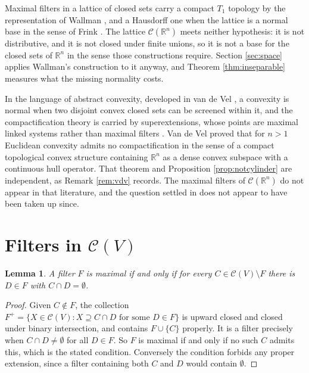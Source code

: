 \documentclass[11pt]{amsart}
\theoremstyle{plain}
\newtheorem{lemma}[theorem]{Lemma}
\theoremstyle{definition}
\newcommand{\CC}{\mathscr{C}}
\newcommand{\RR}{\mathbb{R}}
\begin{document}
Maximal filters in a lattice of closed sets carry a compact $T_1$ topology by the representation of Wallman \cite{Wallman}, and a Hausdorff one when the lattice is a normal base in the sense of Frink \cite{Frink}. The lattice $\CC(\RR^n)$ meets neither hypothesis: it is not distributive, and it is not closed under finite unions, so it is not a base for the closed sets of $\RR^n$ in the sense those constructions require. Section \ref{sec:space} applies Wallman's construction to it anyway, and Theorem \ref{thm:inseparable} measures what the missing normality costs.

In the language of abstract convexity, developed in van de Vel \cite{vdV93}, a convexity is normal when two disjoint convex closed sets can be screened within it, and the compactification theory is carried by superextensions, whose points are maximal linked systems rather than maximal filters \cite{vanMill}. Van de Vel \cite{vdV83} proved that for $n>1$ Euclidean convexity admits no compactification in the sense of a compact topological convex structure containing $\RR^n$ as a dense convex subspace with a continuous hull operator. That theorem and Proposition \ref{prop:notcylinder} are independent, as Remark \ref{rem:vdv} records. The maximal filters of $\CC(\RR^n)$ do not appear in that literature, and the question settled in \cite{vdV83} does not appear to have been taken up since.

\section{Filters in \texorpdfstring{$\CC(V)$}{C(V)}}\label{sec:prelim}

\begin{lemma}\label{lem:crit}
A filter $F$ is maximal if and only if for every $C\in\CC(V)\setminus F$ there is $D\in F$ with $C\cap D=\emptyset$.
\end{lemma}

\begin{proof}
Given $C\notin F$, the collection $F^{+}=\{X\in\CC(V):X\supseteq C\cap D\text{ for some }D\in F\}$ is upward closed and closed under binary intersection, and contains $F\cup\{C\}$ properly. It is a filter precisely when $C\cap D\neq\emptyset$ for all $D\in F$. So $F$ is maximal if and only if no such $C$ admits this, which is the stated condition. Conversely the condition forbids any proper extension, since a filter containing both $C$ and $D$ would contain $\emptyset$.
\end{proof}
\end{document}
